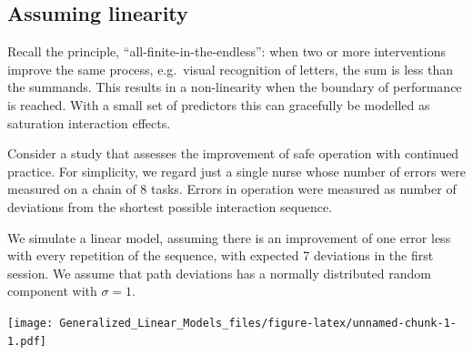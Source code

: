 \documentclass[]{svmono}
\newenvironment{Shaded}{\begin{snugshade}}{\end{snugshade}}
\newcommand{\KeywordTok}[1]{\textcolor[rgb]{0.13,0.29,0.53}{\textbf{#1}}}
\newcommand{\DataTypeTok}[1]{\textcolor[rgb]{0.13,0.29,0.53}{#1}}
\newcommand{\DecValTok}[1]{\textcolor[rgb]{0.00,0.00,0.81}{#1}}
\newcommand{\FloatTok}[1]{\textcolor[rgb]{0.00,0.00,0.81}{#1}}
\newcommand{\StringTok}[1]{\textcolor[rgb]{0.31,0.60,0.02}{#1}}
\newcommand{\OperatorTok}[1]{\textcolor[rgb]{0.81,0.36,0.00}{\textbf{#1}}}
\newcommand{\NormalTok}[1]{#1}
\theoremstyle{definition}
\theoremstyle{definition}
\theoremstyle{definition}
\theoremstyle{remark}
\begin{document}
\subsection{Assuming linearity}\label{assuming-linearity}

Recall the principle, ``all-finite-in-the-endless'': when two or more
interventions improve the same process, e.g.~visual recognition of
letters, the sum is less than the summands. This results in a
non-linearity when the boundary of performance is reached. With a small
set of predictors this can gracefully be modelled as saturation
interaction effects.

Consider a study that assesses the improvement of safe operation with
continued practice. For simplicity, we regard just a single nurse whose
number of errors were measured on a chain of 8 tasks. Errors in
operation were measured as number of deviations from the shortest
possible interaction sequence.

We simulate a linear model, assuming there is an improvement of one
error less with every repetition of the sequence, with expected 7
deviations in the first session. We assume that path deviations has a
normally distributed random component with \(\sigma = 1\).

\begin{Shaded}
\end{Shaded}

\texttt{[image: Generalized\_Linear\_Models\_files/figure-latex/unnamed-chunk-1-1.pdf]}
\end{document}
